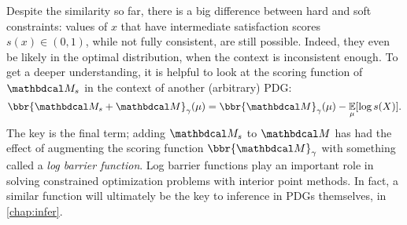 Despite the similarity so far, there is a big difference between hard and soft constraints:
    values of $x$ that have intermediate satisfaction scores $s(x) \in (0,1)$,
    while not fully consistent, are still possible.
Indeed, they even be likely in the optimal distribution, when the context is inconsistent enough. 
To get a deeper understanding, it is helpful to look at the scoring function of 
$\dg M_s$ in the context of another (arbitrary) PDG:
\[
    \bbr{\dg M_s + \dg M}_\gamma(\mu) 
        = \bbr{\dg M}_\gamma(\mu) - \Ex_\mu [ \log s(X) ].
\]
The key is the final term;
    adding $\dg M_s$ to $\dg M$ has had the effect of
    augmenting the scoring function $\bbr{\dg M}_\gamma$ with 
    something called a \emph{log barrier function}.
%
Log barrier functions play an important role in solving constrained optimization problems with interior point methods. In fact, a similar function will ultimately be the key to inference in PDGs themselves, in \cref{chap:infer}.






